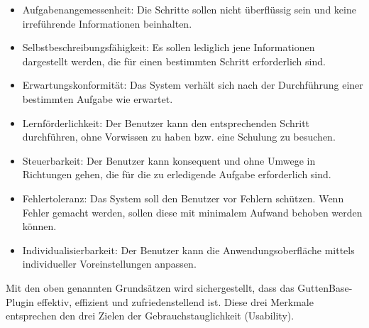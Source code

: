 \begin{itemize}
	\item Aufgabenangemessenheit:
	Die Schritte sollen nicht überflüssig sein und keine irreführende Informationen beinhalten.
	
	\item Selbstbeschreibungsfähigkeit:
	Es sollen lediglich jene Informationen dargestellt werden, die für einen bestimmten Schritt erforderlich sind.
	
	\item Erwartungskonformität:
	Das System verhält sich nach der Durchführung einer bestimmten Aufgabe wie erwartet.
	
	\item Lernförderlichkeit:
	Der Benutzer kann den entsprechenden Schritt durchführen, ohne Vorwissen zu haben bzw. eine Schulung zu besuchen.
	
	\item Steuerbarkeit:
	Der Benutzer kann konsequent und ohne Umwege in Richtungen gehen, die für die zu erledigende Aufgabe erforderlich sind.
	
	\item Fehlertoleranz:
	Das System soll den Benutzer vor Fehlern schützen. Wenn Fehler gemacht werden, sollen diese mit minimalem Aufwand behoben werden können.

	\item Individualisierbarkeit:
	Der Benutzer kann die Anwendungsoberfläche mittels individueller Voreinstellungen anpassen.
	
\end{itemize}
Mit den oben genannten Grundsätzen wird sichergestellt, dass das GuttenBase-Plugin effektiv, effizient und zufriedenstellend ist. Diese drei Merkmale entsprechen den drei Zielen der Gebrauchstauglichkeit (Usability).

